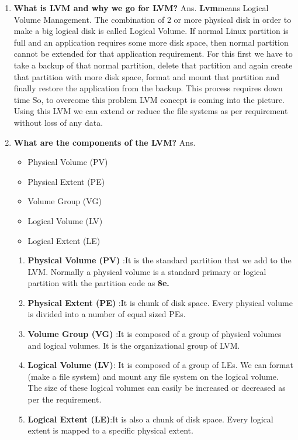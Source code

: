 \begin{enumerate}
\begin{enumerate}
  \item \textbf{What is LVM and why we go for LVM?}
  \newline
   Ans. \textbf{Lvm}means Logical Volume Management. The combination of 2 or more physical disk in order to make a big  	logical disk is called Logical Volume.  
        \newline
        If normal Linux partition is full and an application requires some more disk space, then normal partition cannot 	be extended for that application requirement. For this first we have to take a backup of that normal partition, 	delete that partition and again create that partition with more disk space, format and mount that partition and 	finally restore the application from the backup. This process requires down time
        So, to overcome this problem  LVM  concept is coming into the picture. Using this LVM we can extend or reduce 	the file systems as per requirement without loss of any data.

  \bigskip
  \bigskip

  \item \textbf{What are the components of the LVM?}
  \newline
   Ans.\begin{itemize}
          \item Physical Volume (PV)
          \item Physical Extent (PE)
          \item Volume Group (VG)
          \item Logical Volume (LV)
          \item Logical Extent (LE)
       \end{itemize}
      \begin{enumerate}
        \item \textbf{Physical Volume (PV) }:It is the standard partition that we add to the LVM. Normally a physical volume is a standard primary or logical partition with the partition code as \textbf{8e.}
        \item \textbf{Physical Extent (PE) }:It is chunk of disk space. Every physical volume is divided into a number of equal sized PEs.
        \item \textbf{Volume Group (VG)} :It is composed of a group of physical volumes and logical volumes. It is the organizational group of LVM.
        \item \textbf{Logical Volume (LV)}: It is composed of a group of LEs. We can format (make a file system) and mount any file system on the logical volume. The size of these logical volumes can easily be increased or decreased as per the requirement.
        \item \textbf{Logical Extent (LE)}:It is also a chunk of disk space. Every logical extent is mapped to a specific physical extent.
      \end{enumerate}


\end{enumerate}
\end{enumerate}
